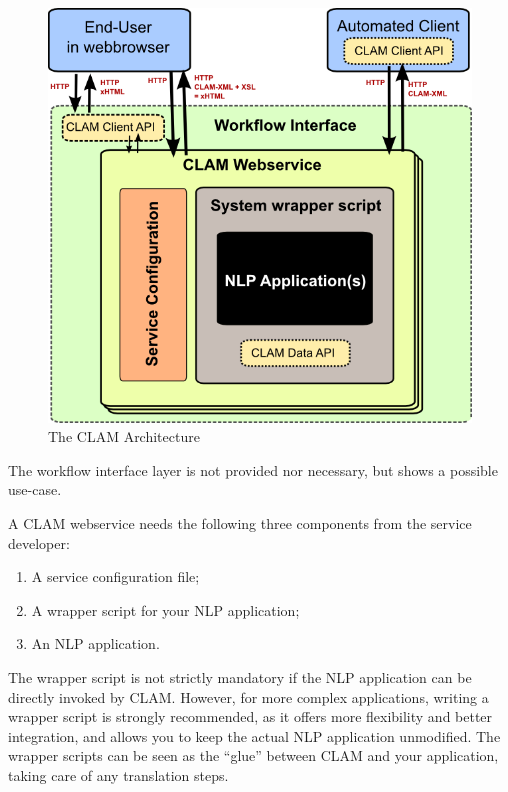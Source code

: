 \documentclass[a4paper,12pt]{report}
\begin{document}
\begin{figure}[h] \begin{center}
\includegraphics[width=130.0mm]{architecture.png}
\end{center}
\caption{The CLAM Architecture}
\label{fig:arch} 
\end{figure}

The workflow interface layer is not provided nor necessary, but shows a possible use-case.

A CLAM webservice needs the following three components from the service developer:

\begin{enumerate}
\item A service configuration file;
\item A wrapper script for your NLP application;
\item An NLP application.
\end{enumerate}

The wrapper script is not strictly mandatory if the NLP application can be
directly invoked by CLAM. However, for more complex applications, writing a
wrapper script is strongly recommended, as it offers more flexibility and
better integration, and allows you to keep the actual NLP application
unmodified. The wrapper scripts can be seen as the ``glue'' between CLAM and
your application, taking care of any translation steps.
\end{document}
